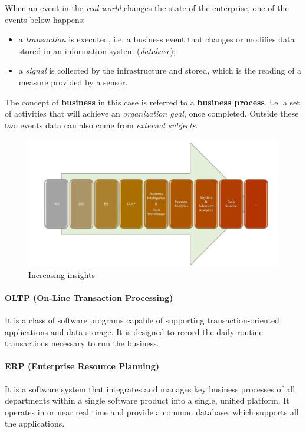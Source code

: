 When an event in the \textit{real world} changes the state of the enterprise, one of the events below happens:
\begin{itemize}
    \item a \textit{transaction} is executed, i.e. a business event that changes or modifies data stored in an information system (\textit{database});
    \item a \textit{signal} is collected by the infrastructure and stored, which is the reading of a measure provided by a sensor.
\end{itemize}
The concept of \textbf{business} in this case is referred to a \textbf{business process}, i.e. a set of activities that will achieve an \textit{organization goal}, once completed. Outside these two events data can also come from \textit{external subjects}.

\begin{figure}
    \centering
    \includegraphics[scale=0.6]{images/increasing_insights.jpg}
    \caption{Increasing insights}
    \label{figInsights}
\end{figure}

\paragraph{OLTP (On-Line Transaction Processing)}
It is a class of software programs capable of supporting transaction-oriented applications and data storage. It is designed to record the daily routine transactions necessary to run the business.

\paragraph{ERP (Enterprise Resource Planning)}
It is a software system that integrates and manages key business processes of all departments within a single software product into a single, unified platform. It operates in or near real time and provide a common database, which supports all the applications.

